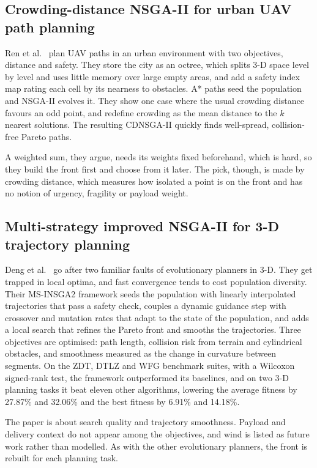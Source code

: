 \subsection{Crowding-distance NSGA-II for urban UAV path planning}

Ren et al.~\cite{r3} plan UAV paths in an urban environment with two objectives,
distance and safety. They store the city as an octree, which splits 3-D space level by
level and uses little memory over large empty areas, and add a safety index map rating
each cell by its nearness to obstacles. A* paths seed the population and NSGA-II
evolves it. They show one case where the usual crowding distance favours an odd point,
and redefine crowding as the mean distance to the $k$ nearest solutions. The resulting
CDNSGA-II quickly finds well-spread, collision-free Pareto paths.

A weighted sum, they argue, needs its weights fixed beforehand, which is hard, so they
build the front first and choose from it later. The pick,
though, is made by
crowding distance, which measures how isolated a point is on the front and has no notion
of urgency, fragility or payload weight.

\subsection{Multi-strategy improved NSGA-II for 3-D trajectory planning}

Deng et al.~\cite{r11} go after two familiar faults of evolutionary planners in 3-D.
They get trapped in local optima, and fast convergence tends to cost population
diversity. Their MS-INSGA2 framework seeds the population with linearly
interpolated trajectories that pass a safety check, couples a dynamic guidance step
with crossover and mutation rates that adapt to the state of the population, and adds a
local search that refines the Pareto front and smooths the trajectories. Three
objectives are optimised: path length, collision risk from terrain and cylindrical
obstacles, and smoothness measured as the change in curvature between segments. On the
ZDT, DTLZ and WFG benchmark suites, with a Wilcoxon signed-rank test, the framework
outperformed its baselines, and on two 3-D planning tasks it beat eleven other
algorithms, lowering the average fitness by 27.87\% and 32.06\% and the best fitness by
6.91\% and 14.18\%.

The paper is about search quality and trajectory smoothness. Payload and delivery
context do not appear among the objectives, and wind is listed as future work rather
than modelled. As with the other evolutionary planners, the front is rebuilt for each
planning task.

